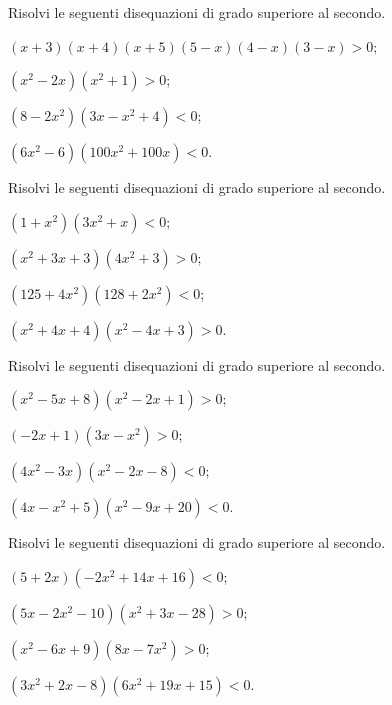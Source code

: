 \begin{esercizio}[\Ast]
 \label{ese:4.45}
Risolvi le seguenti disequazioni di grado superiore al secondo.
\begin{enumeratea}
\item $(x+3)(x+4)(x+5)(5-x)(4-x)(3-x)>0$;
\item $(x^2-2x)(x^2+1)>0$;
\item $(8-2x^2)(3x-x^2+4)<0$;
\item $(6x^2-6)(100x^2+100x)<0$.
\end{enumeratea}
\end{esercizio}

\begin{esercizio}[\Ast]
 \label{ese:4.46}
Risolvi le seguenti disequazioni di grado superiore al secondo.
\begin{multicols}{2}
\begin{enumeratea}
\item $(1+x^2)(3x^2+x)<0$;
\item $(x^2+3x+3)(4x^2+3)>0$;
\item $(125+4x^2)(128+2x^2)<0$;
\item $(x^2+4x+4)(x^2-4x+3)>0$.
\end{enumeratea}
\end{multicols}
\end{esercizio}
\pagebreak
\begin{esercizio}[\Ast]
 \label{ese:4.47}
Risolvi le seguenti disequazioni di grado superiore al secondo.
\begin{multicols}{2}
\begin{enumeratea}
\item $(x^2-5x+8)(x^2-2x+1)>0$;
\item $(-2x+1)(3x-x^2)>0$;
\item $(4x^2-3x)(x^2-2x-8)<0$;
\item $(4x-x^2+5)(x^2-9x+20)<0$.
\end{enumeratea}
\end{multicols}
\end{esercizio}

\begin{esercizio}[\Ast]
 \label{ese:4.48}
Risolvi le seguenti disequazioni di grado superiore al secondo.
\begin{multicols}{2}
\begin{enumeratea}
\item $(5+2x)(-2x^2+14x+16)<0$;
\item $(5x-2x^2-10)(x^2+3x-28)>0$;
\item $(x^2-6x+9)(8x-7x^2)>0$;
\item $(3x^2+2x-8)(6x^2+19x+15)<0$.
\end{enumeratea}
\end{multicols}
\end{esercizio}

